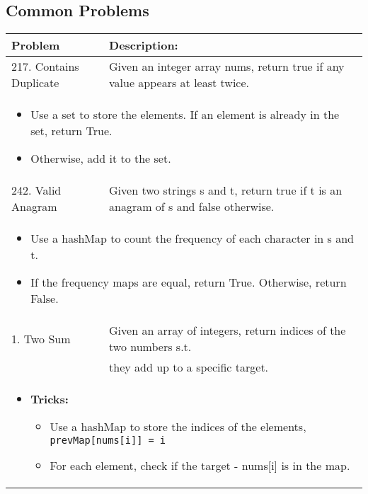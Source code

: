 \subsection{Common Problems}
\begin{summary}
    \begin{center}
        \begin{tabular}{ll}
            \toprule
            \textbf{Problem} & \textbf{Description:} \\
            \midrule
            217. Contains Duplicate & Given an integer array nums, return true if any value appears at least twice. \\
            \multicolumn{2}{p{\linewidth}}{
                \begin{itemize}
                    \item Use a set to store the elements. If an element is already in the set, return True.
                    \item Otherwise, add it to the set.
                \end{itemize}
            } \\
            \midrule
            242. Valid Anagram & Given two strings s and t, return true if t is an anagram of s and false otherwise. \\
            \multicolumn{2}{p{\linewidth}}{
                \begin{itemize}
                    \item Use a hashMap to count the frequency of each character in s and t.
                    \item If the frequency maps are equal, return True. Otherwise, return False.
                \end{itemize}
            } \\
            \midrule
            1. Two Sum & Given an array of integers, return indices of the two numbers s.t. \\
            & they add up to a specific target. \\            
            \multicolumn{2}{p{\linewidth}}{
                \begin{itemize}
                    \item \textbf{Tricks:}
                    \begin{itemize}
                        \item Use a hashMap to store the indices of the elements, \texttt{prevMap[nums[i]] = i}
                        \item For each element, check if the target - nums[i] is in the map.

\end{itemize}
\end{itemize}}
\end{tabular}
\end{center}
\end{summary}
